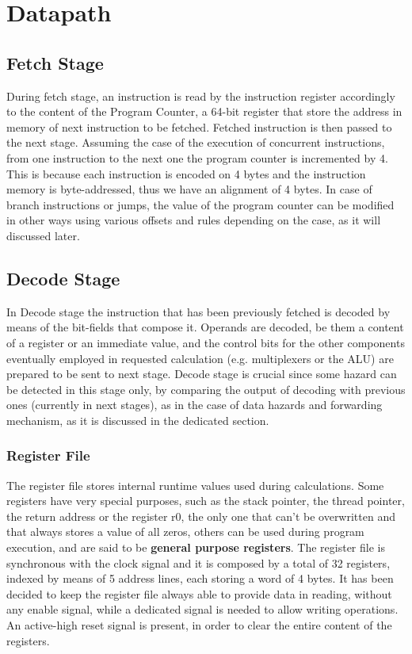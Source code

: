 %
 
\chapter{Datapath}
\label{cha2}
\section{Fetch Stage}
During fetch stage, an instruction is read by the instruction register accordingly to the content of the Program Counter, a 64-bit register that store the address in memory of next instruction to be fetched.
Fetched instruction is then passed to the next stage.
Assuming the case of the execution of concurrent instructions, from one instruction to the next one the program counter is incremented by 4. This is because each instruction is encoded on 4 bytes and the instruction memory is byte-addressed, thus we have an alignment of 4 bytes.
In case of branch instructions or jumps, the value of the program counter can be modified in other ways using various offsets and rules depending on the case, as it will discussed later.

\section{Decode Stage}

In Decode stage the instruction that has been previously fetched is decoded by means of the bit-fields that compose it.
Operands are decoded, be them a content of a register or an immediate value, and the control bits for the other components eventually employed in requested calculation (e.g. multiplexers or the ALU) are prepared to be sent to next stage.
Decode stage is crucial since some hazard can be detected in this stage only, by comparing the output of decoding with previous ones (currently in next stages), as in the case of data hazards and forwarding mechanism, as it is discussed in the dedicated section.

\subsection{Register File}

The register file stores internal runtime values used during calculations.
Some registers have very special purposes, such as the stack pointer, the thread pointer, the return address or the register r0, the only one that can't be overwritten and that always stores a value of all zeros, others can be used during program execution, and are said to be \textbf{general purpose registers}.
The register file is synchronous with the clock signal and it is composed by a total of 32 registers, indexed by means of 5 address lines, each storing a word of 4 bytes.
It has been decided to keep the register file always able to provide data in reading, without any enable signal, while a dedicated signal is needed to allow writing operations.
An active-high reset signal is present, in order to clear the entire content of the registers.

